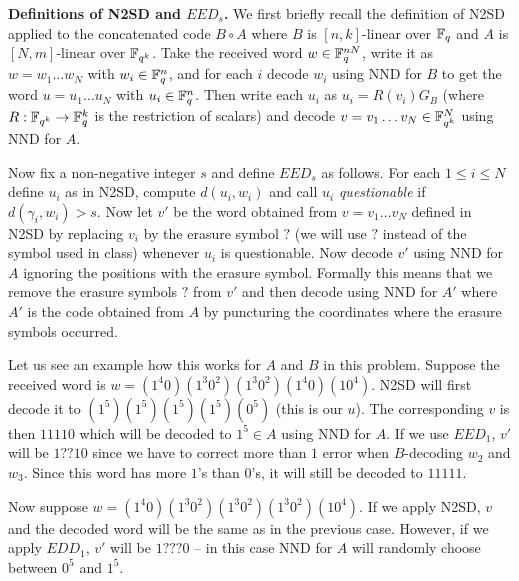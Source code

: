 \documentclass[12pt]{amsart}
\begin{document}
{\bf Definitions of N2SD and $EED_s$.} We first briefly recall the definition of N2SD applied to the concatenated code $B\circ A$ where $B$ is $[n,k]$-linear over ${\mathbb F}_q$
and $A$ is $[N,m]$-linear over ${\mathbb F}_{q^k}$. Take the received word $w\in {\mathbb F}_{q}^{nN}$, write it as $w=w_1\ldots w_N$ with 
$w_i\in {\mathbb F}_{q}^{n}$, and for each $i$ decode $w_i$ using NND for $B$ to get the word $u=u_1\ldots u_N$
with $u_i\in {\mathbb F}_{q}^{n}$. Then write each $u_i$ as $u_i=R(v_i)G_B$ (where $R:{\mathbb F}_{q^k}\to {\mathbb F}_{q}^k$ is the restriction of scalars) and decode $v=v_1\ldots v_N\in {\mathbb F}_{q^k}^N$ using NND for $A$.
\skv

Now fix a non-negative integer $s$ and define $EED_s$ as follows. For each $1\leq i\leq N$ define $u_i$ as in N2SD,
compute $d(u_i,w_i)$ and call $u_i$ {\it questionable} if $d(\gamma_i,w_i)>s$. Now let $v'$ be the word obtained
from $v=v_1\ldots v_N$ defined in N2SD by replacing $v_i$ by the erasure symbol $?$ (we will use $?$ instead of the symbol used in class) whenever $u_i$ is questionable. Now decode $v'$ using NND for $A$ ignoring the positions with the erasure symbol. Formally this means that we remove the erasure symbols $?$ from $v'$ and then decode using NND for $A'$ where $A'$ is the code
obtained from $A$ by puncturing the coordinates where the erasure symbols occurred.
\skv

Let us see an example how this works for $A$ and $B$ in this problem. Suppose the received word is 
$w=(1^4 0)(1^3 0^2)(1^3 0^2)(1^4 0)(1 0^4)$. N2SD will first decode it to $(1^5)(1^5)(1^5)(1^5)(0^5)$ (this is our $u$).
The corresponding $v$ is then $11110$ which will be decoded to $1^5\in A$ using NND for $A$. If we use $EED_1$,
$v'$ will be $1??10$ since we have to correct more than $1$ error when $B$-decoding $w_2$ and $w_3$. Since
this word has more $1$'s than $0$'s, it will still be decoded to $11111$.

Now suppose $w=(1^4 0)(1^3 0^2)(1^3 0^2)(1^3 0^2)(1 0^4)$. If we apply N2SD, $v$ and the decoded word will be the same as in the
previous case. However, if we apply $EDD_1$, $v'$ will be $1???0$ -- in this case NND for $A$ will randomly choose between
$0^5$ and $1^5$.
\end{document}
